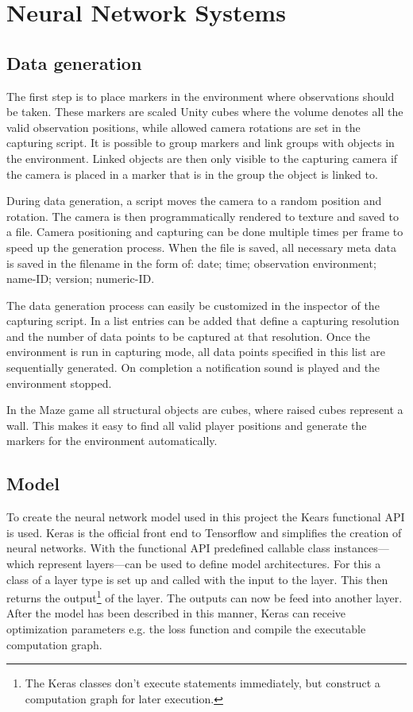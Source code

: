 
\chapter{Neural Network Systems}
\section{Data generation}\label{DataGeneration}
The first step is to place markers in the environment where observations should be taken. These markers are scaled Unity cubes where the volume denotes all the valid observation positions, while allowed camera rotations are set in the capturing script. It is possible to group markers and link groups with objects in the environment. Linked objects are then only visible to the capturing camera if the camera is placed in a marker that is in the group the object is linked to.

During data generation, a script moves the camera to a random position and rotation. The camera is then programmatically rendered to texture and saved to a file. Camera positioning and capturing can be done multiple times per frame to speed up the generation process. When the file is saved, all necessary meta data is saved in the filename in the form of: date; time; observation environment; name-ID; version; numeric-ID.

The data generation process can easily be customized in the inspector of the capturing script. In a list entries can be added that define a capturing resolution and the number of data points to be captured at that resolution. Once the environment is run in capturing mode, all data points specified in this list are sequentially generated. On completion a notification sound is played and the environment stopped.

In the Maze game all structural objects are cubes, where raised cubes represent a wall. This makes it easy to find all valid player positions and generate the markers for the environment automatically.


\section{Model}
To create the neural network model used in this project the Kears functional API is used. Keras is the official front end to Tensorflow and simplifies the creation of neural networks. With the functional API predefined callable class instances---which represent layers---can be used to define model architectures. For this a class of a layer type is set up and called with the input to the layer. This then returns the output\footnote{The Keras classes don't execute statements immediately, but construct a computation graph for later execution.} of the layer. The outputs can now be feed into another layer. After the model has been described in this manner, Keras can receive optimization parameters e.g. the loss function and compile the executable computation graph.


